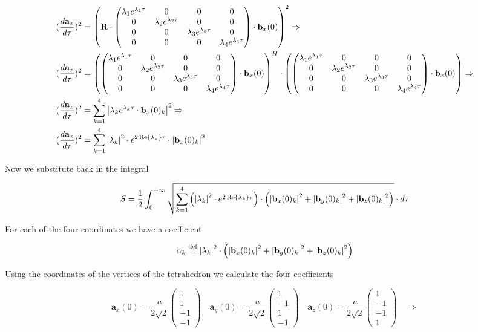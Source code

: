 \documentclass{article}
\newcommand{\vect}[1]{\mathbf{#1}}
\newcommand{\mat}[1]{\mathbf{#1}}
\newcommand*{\defeq}{\stackrel{\text{def}}{=}}
\newcommand{\diagmat}[4]{\begin{pmatrix}
    #1 & 0 & 0 & 0 \\
    0 & #2 & 0 & 0 \\
    0 & 0 & #3 & 0 \\
    0 & 0 & 0 & #4
\end{pmatrix}}
\begin{document}
\begin{align*}
(\frac{d\vect a_x}{d\tau})^2 &= \left(\mat{R}\cdot\diagmat{\lambda_1e^{\lambda_1\tau}}{\lambda_2e^{\lambda_2\tau}}{\lambda_3e^{\lambda_3\tau}}{\lambda_4e^{\lambda_4\tau}}\cdot \vect b_x(0)\right)^2 \Rightarrow \\
(\frac{d\vect a_x}{d\tau})^2 &= \left(\diagmat{\lambda_1e^{\lambda_1\tau}}{\lambda_2e^{\lambda_2\tau}}{\lambda_3e^{\lambda_3\tau}}{\lambda_4e^{\lambda_4\tau}}\cdot \vect b_x(0)\right)^H \cdot \left(\diagmat{\lambda_1e^{\lambda_1\tau}}{\lambda_2e^{\lambda_2\tau}}{\lambda_3e^{\lambda_3\tau}}{\lambda_4e^{\lambda_4\tau}}\cdot \vect b_x(0)\right) \Rightarrow \\
(\frac{d\vect a_x}{d\tau})^2 &= \sum_{k=1}^{4}\abs{\lambda_ke^{\lambda_k\tau}\cdot \vect b_x(0)_k}^2 \Rightarrow \\
(\frac{d\vect a_x}{d\tau})^2 &= \sum_{k=1}^{4}\abs{\lambda_k}^2 \cdot e^{2\Re{\lambda_k}\tau}\cdot \abs{\vect b_x(0)_k}^2
\end{align*}

Now we substitute back in the integral

\begin{align*}
S = \frac{1}{2}\int_0^{+\infty}\sqrt{\sum_{k=1}^{4} \left(\abs{\lambda_k}^2 \cdot e^{2\Re{\lambda_k}\tau} \right) \cdot \left(\abs{\vect b_x(0)_k}^2 + \abs{\vect b_y(0)_k}^2 + \abs{\vect b_z(0)_k}^2\right)}\cdot d\tau
\end{align*}

For each of the four coordinates we have a coefficient

\[\alpha_k \defeq \abs{\lambda_k}^2 \cdot \left(\abs{\vect b_x(0)_k}^2 + \abs{\vect b_y(0)_k}^2 + \abs{\vect b_z(0)_k}^2\right)\]

Using the coordinates of the vertices of the tetrahedron we calculate the four coefficients

\[\vect a_x(0) = \frac{a}{2\sqrt{2}}\begin{pmatrix}
    1\\
    1\\
    -1\\
    -1
\end{pmatrix} \quad
\vect a_y(0) = \frac{a}{2\sqrt{2}}\begin{pmatrix}
    1\\
    -1\\
    1\\
    -1
\end{pmatrix}\quad
\vect a_z(0) = \frac{a}{2\sqrt{2}}\begin{pmatrix}
    1\\
    -1\\
    -1\\
    1
\end{pmatrix}\quad \Rightarrow\]
\end{document}
